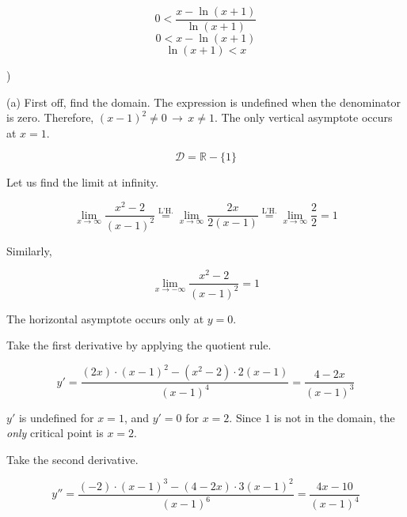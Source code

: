 \documentclass{article}
\begin{document}
\begin{equation*}0<\frac{x-\ln(x+1)}{\ln(x+1)}\end{equation*}
\begin{equation*}0<x-\ln(x+1)\end{equation*}
\begin{equation*}\ln(x+1)<x\end{equation*}

\hfill

)

\hfill

\noindent (a) First off, find the domain. The expression is undefined when the denominator is zero. Therefore, $(x-1)^2\neq0\,\rightarrow\,x\neq1$. The only vertical asymptote occurs at $x = 1$.

\begin{equation*}\mathcal{D} = \mathbb{R} - \{1\}\end{equation*}

\hfill

\noindent Let us find the limit at infinity.

\begin{equation*}\lim_{x\to \infty}\frac{x^2-2}{(x-1)^2} \overset{\text{L'H.}}{=} \lim_{x\to \infty} \frac{2x}{2(x-1)} \overset{\text{L'H.}}{=} \lim_{x\to \infty} \frac{2}{2}=1\end{equation*}

\noindent Similarly,

\begin{equation*}\lim_{x\to -\infty}\frac{x^2-2}{(x-1)^2}=1\end{equation*}

\hfill

\noindent The horizontal asymptote occurs only at $y=0$.

\hfill

\noindent Take the first derivative by applying the quotient rule.

\begin{equation*}y' = \frac{(2x)\cdot (x-1)^2 - (x^2-2)\cdot 2(x-1)}{(x-1)^4}=\frac{4-2x}{(x-1)^3}\end{equation*}

\hfill

\noindent $y'$ is undefined for $x=1$, and $y'=0$ for $x=2$. Since $1$ is not in the domain, the \textit{only} critical point is $x = 2$.

\hfill

\noindent Take the second derivative.

\begin{equation*}y'' = \frac{(-2)\cdot(x-1)^3-(4-2x)\cdot3(x-1)^2 }{(x-1)^6}=\frac{4x-10}{(x-1)^4}\end{equation*}
\end{document}

